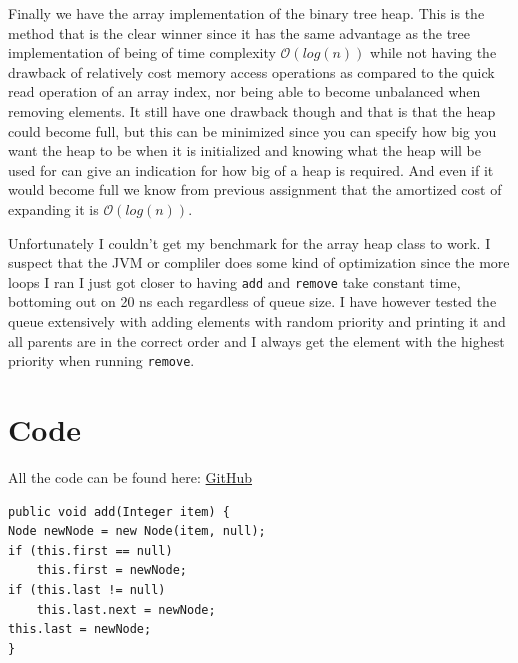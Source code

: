 \documentclass[a4paper,11pt]{article}
\newenvironment{code}{\captionsetup{type=listing}}{}
\begin{document}
Finally we have the array implementation of the binary tree heap. This is the method that is the clear winner 
since it has the same advantage as the tree implementation of being of time complexity $\mathcal{O}(log(n))$
while not having the drawback of relatively cost memory access operations as compared to the quick read operation 
of an array index, nor being able to become unbalanced when removing elements. It still have one drawback though 
and that is that the heap could become full, but this can be minimized since you can specify how big you want 
the heap to be when it is initialized and knowing what the heap will be used for can give an indication for how 
big of a heap is required. And even if it would become full we know from previous assignment that the amortized 
cost of expanding it is $\mathcal{O}(log(n))$. 

Unfortunately I couldn't get my benchmark for the array heap class to work. I suspect that the JVM or compliler 
does some kind of optimization since the more loops I ran I just got closer to having {\tt add} and 
{\tt remove} take constant time, bottoming out on 20 ns each regardless of queue size. I have however tested the 
queue extensively with adding elements with random priority and printing it and all parents are in the correct order 
and I always get the element with the highest priority when running {\tt remove}.  


\newpage
\FloatBarrier
\section*{Code}
All the code can be found here: \href{https://github.com/adrian-jonsson-sjoedin/ID1021-AlgoData/tree/main/Tasks/Priority-Queues/src}{GitHub}

\begin{code}
    \label{code:ListQueueAdd}
    \begin{verbatim}
public void add(Integer item) {
Node newNode = new Node(item, null);
if (this.first == null)
    this.first = newNode;
if (this.last != null)
    this.last.next = newNode;
this.last = newNode;
}
\end{verbatim}
\end{code}
\end{document}
